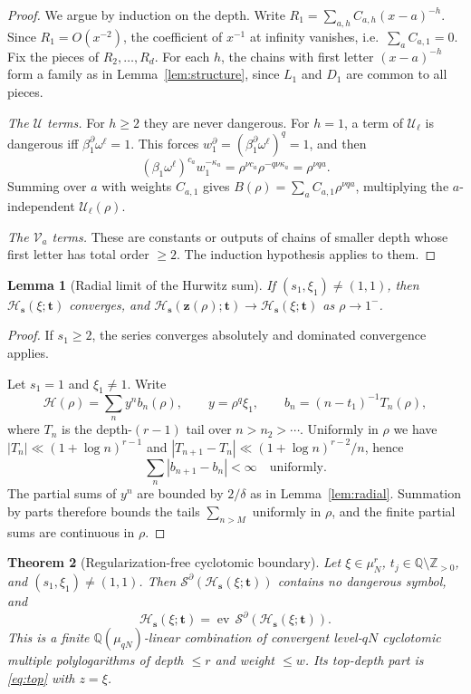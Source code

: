 \documentclass[11pt]{amsart}
\newtheorem{theorem}{Theorem}[section]
\newtheorem{lemma}[theorem]{Lemma}
\theoremstyle{definition}
\theoremstyle{remark}
\numberwithin{equation}{section}
\newcommand{\Z}{\mathbb{Z}}
\newcommand{\Q}{\mathbb{Q}}
\newcommand{\ev}{\operatorname{ev}}
\newcommand{\cS}{\mathcal{S}}
\newcommand{\s}{\mathbf{s}}
\newcommand{\z}{\mathbf{z}}
\newcommand{\tb}{\mathbf{t}}
\newcommand{\Hs}{\mathcal{H}}
\begin{document}
\begin{proof}
We argue by induction on the depth. Write $R_1=\sum_{a,h}C_{a,h}(x-a)^{-h}$. Since $R_1=O(x^{-2})$, the coefficient of $x^{-1}$ at infinity vanishes, i.e.\ $\sum_aC_{a,1}=0$. Fix the pieces of $R_2,\dots,R_d$. For each $h$, the chains with first letter $(x-a)^{-h}$ form a family as in Lemma~\ref{lem:structure}, since $L_1$ and $D_1$ are common to all pieces.

\emph{The $\mathcal U$ terms.} For $h\ge2$ they are never dangerous. For $h=1$, a term of $\mathcal U_\ell$ is dangerous iff $\beta_1^\partial\omega^\ell=1$. This forces $w_1^\partial=(\beta_1^\partial\omega^\ell)^q=1$, and then
\[
(\beta_1\omega^\ell)^{c_a}w_1^{-\kappa_a}=\rho^{\nu c_a}\rho^{-q\nu\kappa_a}=\rho^{\nu qa}.
\]
Summing over $a$ with weights $C_{a,1}$ gives $B(\rho)=\sum_aC_{a,1}\rho^{\nu qa}$, multiplying the $a$-independent $\mathcal U_\ell(\rho)$.

\emph{The $\mathcal V_a$ terms.} These are constants or outputs of chains of smaller depth whose first letter has total order $\ge2$. The induction hypothesis applies to them.
\end{proof}

\begin{lemma}[Radial limit of the Hurwitz sum]\label{lem:Hlimit}
If $(s_1,\xi_1)\ne(1,1)$, then $\Hs_\s(\xi;\tb)$ converges, and $\Hs_\s(\z(\rho);\tb)\to\Hs_\s(\xi;\tb)$ as $\rho\to1^-$.
\end{lemma}

\begin{proof}
If $s_1\ge2$, the series converges absolutely and dominated convergence applies.

Let $s_1=1$ and $\xi_1\ne1$. Write
\[
\Hs(\rho)=\sum_ny^nb_n(\rho),\qquad y=\rho^q\xi_1,\qquad b_n=(n-t_1)^{-1}T_n(\rho),
\]
where $T_n$ is the depth-$(r-1)$ tail over $n>n_2>\cdots$. Uniformly in $\rho$ we have $|T_n|\ll(1+\log n)^{r-1}$ and $|T_{n+1}-T_n|\ll(1+\log n)^{r-2}/n$, hence
\[
\sum_n|b_{n+1}-b_n|<\infty\quad\text{uniformly}.
\]
The partial sums of $y^n$ are bounded by $2/\delta$ as in Lemma~\ref{lem:radial}. Summation by parts therefore bounds the tails $\sum_{n>M}$ uniformly in $\rho$, and the finite partial sums are continuous in $\rho$.
\end{proof}

\begin{theorem}[Regularization-free cyclotomic boundary]\label{thm:boundary}
Let $\xi\in\mu_N^r$, $t_j\in\Q\setminus\Z_{>0}$, and $(s_1,\xi_1)\ne(1,1)$. Then $\cS^\partial(\Hs_\s(\xi;\tb))$ contains no dangerous symbol, and
\[
\Hs_\s(\xi;\tb)=\ev\,\cS^\partial(\Hs_\s(\xi;\tb)).
\]
This is a finite $\Q(\mu_{qN})$-linear combination of convergent level-$qN$ cyclotomic multiple polylogarithms of depth $\le r$ and weight $\le w$. Its top-depth part is \eqref{eq:top} with $z=\xi$.
\end{theorem}
\end{document}
